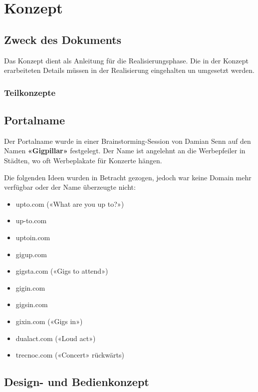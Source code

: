 \chapter{Konzept}

\label{AppendixKonzept}

\section{Zweck des Dokuments}\label{KonzeptZweck}

Das Konzept dient als Anleitung für die Realisierungsphase. Die in der Konzept
erarbeiteten Details müssen in der Realisierung eingehalten un umgesetzt
werden.

\subsection{Teilkonzepte}



\clearpage
\section{Portalname}\label{portalname}

Der Portalname wurde in einer Brainstorming-Session von Damian Senn auf
den Namen \textbf{«Gigpillar»} festgelegt. Der Name ist angelehnt an die Werbepfeiler in
Städten, wo oft Werbeplakate für Konzerte hängen.

Die folgenden Ideen wurden in Betracht gezogen, jedoch war keine Domain mehr
verfügbar oder der Name überzeugte nicht:

\begin{itemize}
  \item{} upto.com («What are you up to?»)
  \item{} up-to.com
  \item{} uptoin.com
  \item{} gigup.com
  \item{} gigsta.com («Gigs to attend»)
  \item{} gigin.com
  \item{} gigsin.com
  \item{} gixin.com («Gigs in»)
  \item{} dualact.com («Loud act»)
  \item{} trecnoc.com («Concert» rückwärts)
\end{itemize}

\clearpage
\section{Design- und Bedienkonzept}\label{design--und-bedienkonzept}

